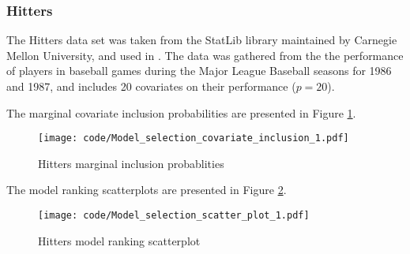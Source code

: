 \documentclass{amsart}[12pt]
\begin{document}



\subsubsection{Hitters}

The Hitters data set was taken from the StatLib library maintained by Carnegie Mellon University, and used in
\cite{James:2014:ISL:2517747}. The data was gathered from the the performance of players in baseball games
during the Major League Baseball seasons for 1986 and 1987, and includes 20 covariates on their performance
($p=20$).

The marginal covariate inclusion probabilities are presented in Figure \ref{fig:Hitters_inclusion}.

\begin{figure}[p]
	\texttt{[image: code/Model\_selection\_covariate\_inclusion\_1.pdf]}
	\caption{Hitters marginal inclusion probablities}
	\label{fig:Hitters_inclusion}
\end{figure}

The model ranking scatterplots are presented in Figure \ref{fig:Hitters_model_ranking}.



\begin{figure}[p]
	\texttt{[image: code/Model\_selection\_scatter\_plot\_1.pdf]}
	\caption{Hitters model ranking scatterplot}
	\label{fig:Hitters_model_ranking}
\end{figure}
\end{document}
